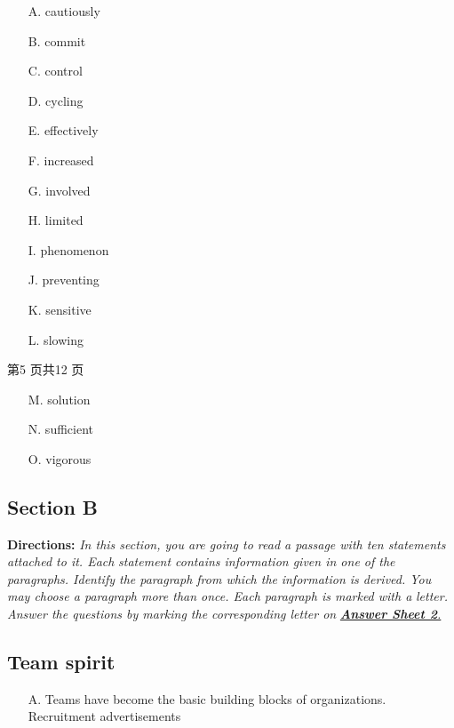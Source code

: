 \documentclass[UTF8,11pt]{ctexart}
\begin{document}
\begin{itemize}[leftmargin=2em,itemsep=.2em,topsep=.4em]\item[A.] cautiously
\item[B.] commit
\item[C.] control
\item[D.] cycling
\item[E.] effectively
\item[F.] increased
\item[G.] involved
\item[H.] limited
\item[I.] phenomenon
\item[J.] preventing
\item[K.] sensitive
\item[L.] slowing
\end{itemize}

第5 页共12 页


\begin{itemize}[leftmargin=2em,itemsep=.2em,topsep=.4em]\item[M.] solution
\item[N.] sufficient
\item[O.] vigorous
\end{itemize}

\subsection*{\textbf{Section B}}


\textbf{Directions:}\textit{ In this section, you are going to read a passage with ten statements attached to it. Each} \textit{statement contains information given in one of the paragraphs. Identify the paragraph from which the} \textit{information is derived. You may choose a paragraph more than once. Each paragraph is marked with a} \textit{letter. Answer the questions by marking the corresponding letter on}\textbf{\textit{ }}\textbf{\textit{\uline{Answer Sheet 2}}}\textit{\uline{.}}


\subsection*{\textbf{Team spirit}}


\begin{itemize}[leftmargin=2em,itemsep=.2em,topsep=.4em]\item[A.] Teams have become the basic building blocks of organizations. Recruitment advertisements
\end{itemize}
\end{document}
